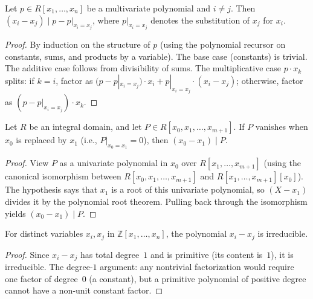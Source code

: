 \begin{lemma}
\label{lem.det.X-sub-X-dvd-sub-subst}
\leanhelper
\leanok
Let $p \in R[x_1, \ldots, x_n]$ be a multivariate polynomial and $i \neq j$.
Then $(x_i - x_j) \mid p - p|_{x_i = x_j}$, where $p|_{x_i = x_j}$
denotes the substitution of $x_j$ for $x_i$.
\end{lemma}

\begin{proof}
\leanok
By induction on the structure of $p$ (using the polynomial recursor on
constants, sums, and products by a variable).
The base case (constants) is trivial. The additive case follows from
divisibility of sums. The multiplicative case $p \cdot x_k$ splits:
if $k = i$, factor as $(p - p|_{x_i = x_j}) \cdot x_i + p|_{x_i = x_j} \cdot (x_i - x_j)$;
otherwise, factor as $(p - p|_{x_i = x_j}) \cdot x_k$.
\end{proof}

\begin{lemma}
\label{lem.det.X-sub-X-dvd-eval-zero}
\leanhelper
\leanok
Let $R$ be an integral domain, and let
$P \in R[x_0, x_1, \ldots, x_{m+1}]$. If $P$ vanishes when $x_0$ is
replaced by $x_1$ (i.e., $P|_{x_0 = x_1} = 0$), then
$(x_0 - x_1) \mid P$.
\end{lemma}

\begin{proof}
\leanok
View $P$ as a univariate polynomial in $x_0$
over $R[x_1, \ldots, x_{m+1}]$ (using the canonical isomorphism
between $R[x_0, x_1, \ldots, x_{m+1}]$ and $R[x_1, \ldots, x_{m+1}][x_0]$).
The hypothesis says that $x_1$ is a root
of this univariate polynomial, so $(X - x_1)$ divides it by the polynomial
root theorem. Pulling back through the isomorphism yields
$(x_0 - x_1) \mid P$.
\end{proof}

\begin{lemma}
\label{lem.det.X-sub-X-irreducible}
\leanhelper
\leanok
For distinct variables $x_i, x_j$ in $\mathbb{Z}[x_1, \ldots, x_n]$,
the polynomial $x_i - x_j$ is irreducible.
\end{lemma}

\begin{proof}
\leanok
Since $x_i - x_j$ has total degree~$1$ and is primitive (its content is~$1$),
it is irreducible. The degree-$1$ argument: any nontrivial factorization
would require one factor of degree~$0$ (a constant), but a primitive
polynomial of positive degree cannot have a non-unit constant factor.
\end{proof}

